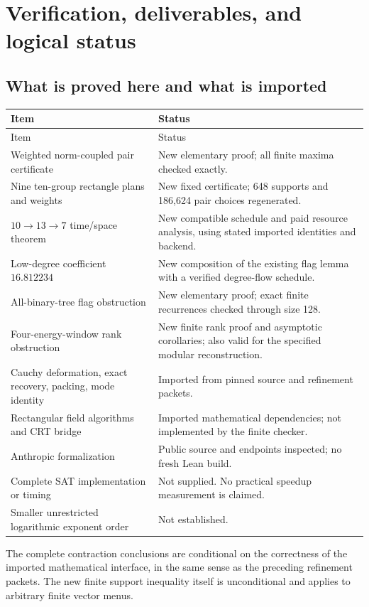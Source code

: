 \section{Verification, deliverables, and logical status}
\label{sec:verification}

\subsection{What is proved here and what is imported}

\begin{longtable}{p{5.0cm}p{8.7cm}}
\toprule Item & Status\\\midrule\endfirsthead
\toprule Item & Status\\\midrule\endhead
\bottomrule\endfoot
Weighted norm-coupled pair certificate & New elementary proof; all finite maxima checked exactly.\\
Nine ten-group rectangle plans and weights & New fixed certificate; 648 supports and 186,624 pair choices regenerated.\\
$10\to13\to7$ time/space theorem & New compatible schedule and paid resource analysis, using stated imported identities and backend.\\
Low-degree coefficient $16.812234$ & New composition of the existing flag lemma with a verified degree-flow schedule.\\
All-binary-tree flag obstruction & New elementary proof; exact finite recurrences checked through size 128.\\
Four-energy-window rank obstruction & New finite rank proof and asymptotic corollaries; also valid for the specified modular reconstruction.\\
Cauchy deformation, exact recovery, packing, mode identity & Imported from pinned source and refinement packets.\\
Rectangular field algorithms and CRT bridge & Imported mathematical dependencies; not implemented by the finite checker.\\
Anthropic formalization & Public source and endpoints inspected; no fresh Lean build.\\
Complete SAT implementation or timing & Not supplied. No practical speedup measurement is claimed.\\
Smaller unrestricted logarithmic exponent order & Not established.\\
\end{longtable}

The complete contraction conclusions are conditional on the correctness of
the imported mathematical interface, in the same sense as the preceding
refinement packets. The new finite support inequality itself is unconditional
and applies to arbitrary finite vector menus.

